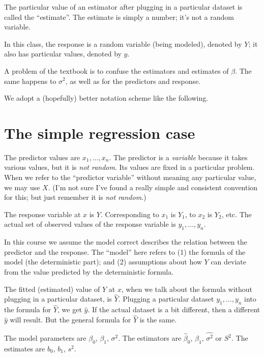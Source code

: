 \documentclass[12pt]{article}
\begin{document}
The particular value of an estimator after plugging in a particular dataset
is called the ``estimate''.
The estimate is simply a number; it's not a random variable.

In this class,
the response is a random variable (being modeled), denoted by $Y$;
it also has particular values, denoted by $y$.

A problem of the textbook is to confuse
the estimators and estimates of $\beta$.
The same happens to $\sigma^2$,
as well as for the predictors and response.

We adopt a (hopefully) better notation scheme like the following.

\section{The simple regression case}

The predictor values are $x_1,\dotsc, x_n$.
The predictor is a \emph{variable} because it takes various values,
but it is \emph{not random}.
Its values are fixed in a particular problem.
When we refer to the ``predictor variable'' without meaning any
particular value, we may use $X$.
(I'm not sure I've found a really simple and consistent convention for
this; but just remember it is \emph{not random}.)

The response variable at $x$ is $Y$.
Corresponding to $x_1$ is $Y_1$, to $x_2$ is $Y_2$, etc.
The actual set of observed values of the response variable is
$y_1,\dotsc, y_n$.

In this course we assume the model correct describes the relation
between the predictor and the response.
The ``model'' here refers to
(1) the formula of the model (the deterministic part);
and
(2) assumptions about how $Y$ can deviate from the value predicted by
the deterministic formula.

The fitted (\ie estimated) value of $Y$ at $x$,
when we talk about the formula without plugging in a
particular dataset, is $\hat{Y}$.
Plugging a particular dataset $y_1,\dotsc,y_n$ into
the formula for $\hat{Y}$, we get $\hat{y}$.
If the actual dataset is a bit different, then a different $\hat{y}$
will result.
But the general formula for $\hat{Y}$ is the same.

The model parameters are $\beta_0$, $\beta_1$, $\sigma^2$.
The estimators are $\hat{\beta}_0$, $\hat{\beta}_1$,
$\hat{\sigma^2}$ or $S^2$.
The estimates are $b_0$, $b_1$, $s^2$.
\end{document}
